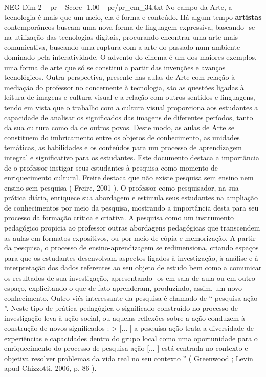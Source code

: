 \begin{textsample}{NEG Dim 2 – pr – Score -1.00 – pr/pr\_em\_34.txt}  \label{ex:f2_neg_178}
No campo da Arte, a tecnologia é mais que um meio, ela é forma e conteúdo.
Há algum tempo \textbf{artistas} contemporâneos buscam uma nova forma de linguagem expressiva, baseando -se na utilização das tecnologias digitais, procurando encontrar uma arte mais comunicativa, buscando uma ruptura com a arte do passado num ambiente dominado pela interatividade.
O advento do cinema é um dos maiores exemplos, uma forma de arte que só se constitui a partir das invenções e avanços tecnológicos.
Outra perspectiva, presente nas aulas de Arte com relação à mediação do professor no concernente à tecnologia, são as questões ligadas à leitura de imagens e cultura visual e a relação com outros sentidos e linguagens, tendo em vista que o trabalho com a cultura visual proporciona aos estudantes a capacidade de analisar os significados das imagens de diferentes períodos, tanto da sua cultura como da de outros povos.
Deste modo, as aulas de Arte se constituem do imbricamento entre os objetos de conhecimento, as unidades temáticas, as habilidades e os conteúdos para um processo de aprendizagem integral e significativo para os estudantes.
Este documento destaca a importância de o professor instigar seus estudantes à pesquisa como momento de enriquecimento cultural.
Freire destaca que não existe pesquisa sem ensino nem ensino sem pesquisa ( Freire, 2001 ).
O professor como pesquisador, na sua prática diária, enriquece sua abordagem e estimula seus estudantes na ampliação de conhecimentos por meio da pesquisa, mostrando a importância desta para seu processo da formação crítica e criativa.
A pesquisa como um instrumento pedagógico propicia ao professor outras abordagens pedagógicas que transcendem as aulas em formatos expositivos, ou por meio de cópia e memorização.
A partir da pesquisa, o processo de ensino-aprendizagem se redimensiona, criando espaços para que os estudantes desenvolvam aspectos ligados à investigação, à análise e à interpretação dos dados referentes ao seu objeto de estudo bem como a comunicar os resultados de sua investigação, apresentando -os em sala de aula ou em outro espaço, explicitando o que de fato aprenderam, produzindo, assim, um novo conhecimento.
Outro viés interessante da pesquisa é chamado de “ pesquisa-ação ”.
Neste tipo de prática pedagógica o significado construído no processo de investigação leva à ação social, ou aquelas reflexões sobre a ação conduzem à construção de novos significados : > [... ] a pesquisa-ação trata a diversidade de experiências e capacidades dentro do grupo local como uma oportunidade para o enriquecimento do processo de pesquisa-ação [... ] está centrada no contexto e objetiva resolver problemas da vida real no seu contexto ” ( Greenwood ; Levin apud Chizzotti, 2006, p. 86 ).

\end{textsample}
